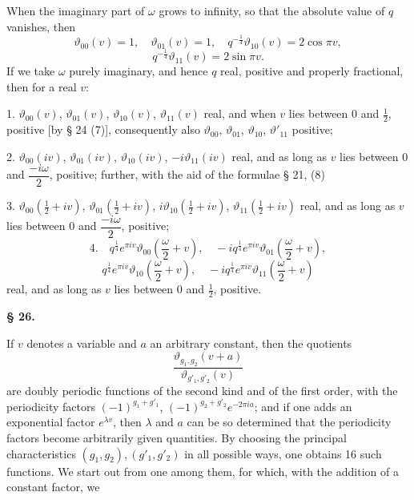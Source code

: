 When the imaginary part of $\omega$ grows to infinity, so
that the absolute value of $q$ vanishes, then
\[
\vartheta_{00}(v) = 1, \quad \vartheta_{01}(v) = 1, \quad q^{-\frac{1}{4}}\vartheta_{10}(v) = 2\cos\pi v,
\]
\[
q^{-\frac{1}{4}}\vartheta_{11}(v) = 2\sin\pi v.
\]
If we take $\omega$ purely imaginary, and hence $q$ real, positive and properly
fractional, then for a real $v$:

1. $\vartheta_{00}(v)$, $\vartheta_{01}(v)$, $\vartheta_{10}(v)$, $\vartheta_{11}(v)$ real, and when $v$ lies between 0
and $\frac{1}{2}$, positive [by § 24 (7)], consequently also $\vartheta_{00}$, $\vartheta_{01}$, $\vartheta_{10}$, $\vartheta'_{11}$
positive;

2. $\vartheta_{00}(iv)$, $\vartheta_{01}(iv)$, $\vartheta_{10}(iv)$, $-i\vartheta_{11}(iv)$ real, and as long as $v$
lies between 0 and $\dfrac{-i\omega}{2}$, positive; further, with the aid of the
formulae § 21, (8)

3. $\vartheta_{00}(\frac{1}{2}+iv)$, $\vartheta_{01}(\frac{1}{2}+iv)$, $i\vartheta_{10}(\frac{1}{2}+iv)$, $\vartheta_{11}(\frac{1}{2}+iv)$
real, and as long as $v$ lies between 0 and $\dfrac{-i\omega}{2}$, positive;
\[
4. \quad q^{\frac{1}{4}}e^{\pi iv}\vartheta_{00}\left(\frac{\omega}{2}+v\right), \quad -iq^{\frac{1}{4}}e^{\pi iv}\vartheta_{01}\left(\frac{\omega}{2}+v\right),
\]
\[
q^{\frac{1}{4}}e^{\pi iv}\vartheta_{10}\left(\frac{\omega}{2}+v\right), \quad -iq^{\frac{1}{4}}e^{\pi iv}\vartheta_{11}\left(\frac{\omega}{2}+v\right)
\]
real, and as long as $v$ lies between 0 and $\frac{1}{2}$, positive.

\begin{center}
\textbf{§ 26. }
\end{center}

If $v$ denotes a variable and $a$ an arbitrary constant, then
the quotients
\[
\frac{\vartheta_{g_1,g_2}(v+a)}{\vartheta_{g'_1,g'_2}(v)}
\]
are doubly periodic functions of the second kind and of the first order,
with the periodicity factors $(-1)^{g_1+g'_1}$, $(-1)^{g_2+g'_2}e^{-2\pi ia}$; and
if one adds an exponential factor $e^{\lambda v}$, then $\lambda$
and $a$ can be so determined that the periodicity factors become arbitrarily given quantities. By choosing the principal characteristics
$(g_1,g_2), (g'_1,g'_2)$ in all possible ways, one obtains 16 such
functions. We start out from one among them, for which, with the
addition of a constant factor, we
